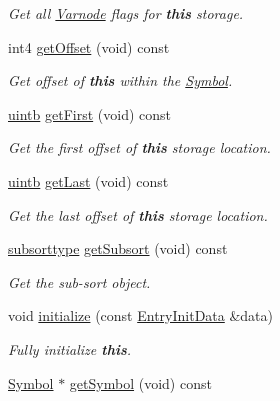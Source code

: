 \begin{DoxyCompactItemize}
\begin{DoxyCompactList}\small\item\em Get all \mbox{\hyperlink{class_varnode}{Varnode}} flags for {\bfseries{this}} storage. \end{DoxyCompactList}\item 
int4 \mbox{\hyperlink{class_symbol_entry_a79274b1741dc33bbc57d5667b4df4eae}{get\+Offset}} (void) const
\begin{DoxyCompactList}\small\item\em Get offset of {\bfseries{this}} within the \mbox{\hyperlink{class_symbol}{Symbol}}. \end{DoxyCompactList}\item 
\mbox{\hyperlink{types_8h_a2db313c5d32a12b01d26ac9b3bca178f}{uintb}} \mbox{\hyperlink{class_symbol_entry_af4927191c7a854bde58782700c5a5f63}{get\+First}} (void) const
\begin{DoxyCompactList}\small\item\em Get the first offset of {\bfseries{this}} storage location. \end{DoxyCompactList}\item 
\mbox{\hyperlink{types_8h_a2db313c5d32a12b01d26ac9b3bca178f}{uintb}} \mbox{\hyperlink{class_symbol_entry_acda4239e668f63bfb99c89a347d6b024}{get\+Last}} (void) const
\begin{DoxyCompactList}\small\item\em Get the last offset of {\bfseries{this}} storage location. \end{DoxyCompactList}\item 
\mbox{\hyperlink{class_symbol_entry_a3163188293595446b1f1dafccab7df15}{subsorttype}} \mbox{\hyperlink{class_symbol_entry_afb88a4dae96af6bb42c0bd0434d7e756}{get\+Subsort}} (void) const
\begin{DoxyCompactList}\small\item\em Get the sub-\/sort object. \end{DoxyCompactList}\item 
void \mbox{\hyperlink{class_symbol_entry_a46693677a8ea05b33472f8a1714efbb7}{initialize}} (const \mbox{\hyperlink{class_symbol_entry_1_1_entry_init_data}{Entry\+Init\+Data}} \&data)
\begin{DoxyCompactList}\small\item\em Fully initialize {\bfseries{this}}. \end{DoxyCompactList}\item 
\mbox{\hyperlink{class_symbol}{Symbol}} $\ast$ \mbox{\hyperlink{class_symbol_entry_a4279c38e7f124423d5f6cbb353a33f49}{get\+Symbol}} (void) const

\end{DoxyCompactItemize}

